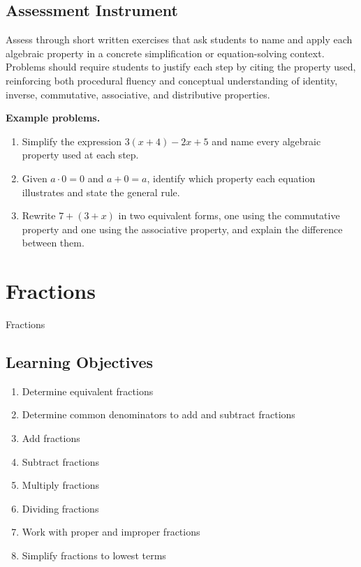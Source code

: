 \subsection{Assessment Instrument}
\label{ssec:asse-370c}

Assess through short written exercises that ask students to name and apply each algebraic
property in a concrete simplification or equation-solving context. Problems should require
students to justify each step by citing the property used, reinforcing both procedural
fluency and conceptual understanding of identity, inverse, commutative, associative, and
distributive properties.

\textbf{Example problems.}

\begin{enumerate}
    \item Simplify the expression $3(x + 4) - 2x + 5$ and name every algebraic property used at each step.
    \item Given $a \cdot 0 = 0$ and $a + 0 = a$, identify which property each equation illustrates and state the general rule.
    \item Rewrite $7 + (3 + x)$ in two equivalent forms, one using the commutative property and one using the associative property, and explain the difference between them.
\end{enumerate}

\section{Fractions}
\label{sec:frac-8099}

Fractions

\subsection{Learning Objectives}
\label{ssec:lear-10a5}

\begin{enumerate}
    \item Determine equivalent fractions
    \item Determine common denominators to add and subtract fractions
    \item Add fractions
    \item Subtract fractions
    \item Multiply fractions
    \item Dividing fractions
    \item Work with proper and improper fractions
    \item Simplify fractions to lowest terms
\end{enumerate}

